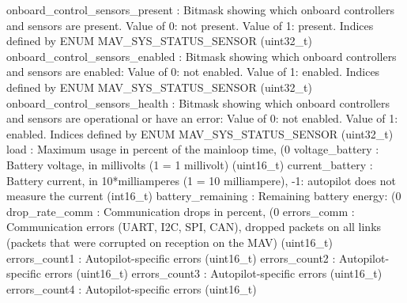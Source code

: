 \begin{DoxyVerb}
\begin{DoxyVerb}
\begin{DoxyVerb}
\begin{DoxyVerb}
\begin{DoxyVerb}
\begin{DoxyVerb}
\begin{DoxyVerb}
\begin{DoxyVerb}
\begin{DoxyVerb}
\begin{DoxyVerb}
\begin{DoxyVerb}
onboard_control_sensors_present        : Bitmask showing which onboard controllers and sensors are present. Value of 0: not present. Value of 1: present. Indices defined by ENUM MAV_SYS_STATUS_SENSOR (uint32_t)
onboard_control_sensors_enabled        : Bitmask showing which onboard controllers and sensors are enabled:  Value of 0: not enabled. Value of 1: enabled. Indices defined by ENUM MAV_SYS_STATUS_SENSOR (uint32_t)
onboard_control_sensors_health        : Bitmask showing which onboard controllers and sensors are operational or have an error:  Value of 0: not enabled. Value of 1: enabled. Indices defined by ENUM MAV_SYS_STATUS_SENSOR (uint32_t)
load                      : Maximum usage in percent of the mainloop time, (0%
voltage_battery           : Battery voltage, in millivolts (1 = 1 millivolt) (uint16_t)
current_battery           : Battery current, in 10*milliamperes (1 = 10 milliampere), -1: autopilot does not measure the current (int16_t)
battery_remaining         : Remaining battery energy: (0%
drop_rate_comm            : Communication drops in percent, (0%
errors_comm               : Communication errors (UART, I2C, SPI, CAN), dropped packets on all links (packets that were corrupted on reception on the MAV) (uint16_t)
errors_count1             : Autopilot-specific errors (uint16_t)
errors_count2             : Autopilot-specific errors (uint16_t)
errors_count3             : Autopilot-specific errors (uint16_t)
errors_count4             : Autopilot-specific errors (uint16_t)\end{DoxyVerb}
 \mbox{\label{classpymavlink_1_1dialects_1_1v10_1_1MAVLink_a4965930dad55c57d7bc1a508345de3a5}} 

\end{DoxyVerb}
\end{DoxyVerb}
\end{DoxyVerb}
\end{DoxyVerb}
\end{DoxyVerb}
\end{DoxyVerb}
\end{DoxyVerb}
\end{DoxyVerb}
\end{DoxyVerb}
\end{DoxyVerb}
